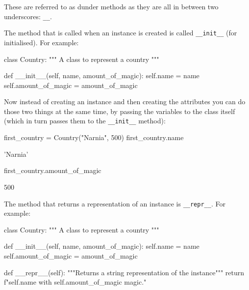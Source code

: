 These are referred to as dunder methods as they are all in between two
underscores: \texttt{\_\_}.


The method that is called when an instance is created is called \texttt{\_\_init\_\_} (for
initialised). For example:


\begin{api}
class Country:
    """
    A class to represent a country
    """

    def __init__(self, name, amount_of_magic):
        self.name = name
        self.amount_of_magic = amount_of_magic
\end{api}





Now instead of creating an instance and then creating the attributes you can do
those two things at the same time, by passing the variables to the class itself
(which in turn passes them to the \texttt{\_\_init\_\_} method):




\begin{pyin}
first_country = Country("Narnia", 500)
first_country.name
\end{pyin}





\begin{raw}
'Narnia'
\end{raw}


\begin{pyin}
first_country.amount_of_magic
\end{pyin}





\begin{raw}
500
\end{raw}





The method that returns a representation of an instance is \texttt{\_\_repr\_\_}. For
example:




\begin{pyin}
class Country:
    """
    A class to represent a country
    """

    def __init__(self, name, amount_of_magic):
        self.name = name
        self.amount_of_magic = amount_of_magic

    def __repr__(self):
        """Returns a string representation of the instance"""
        return f"{self.name} with {self.amount_of_magic} magic."
\end{pyin}







